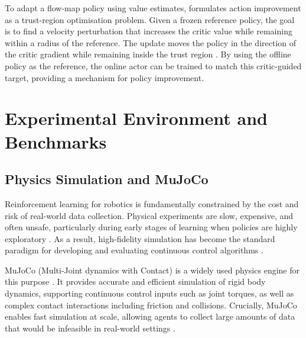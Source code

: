 To adapt a flow-map policy using value estimates, \cite{ziakas2026aligningflowmappolicies} formulates action improvement as a trust-region optimisation problem. Given a frozen reference policy, the goal is to find a velocity perturbation that increases the critic value while remaining within a radius of the reference.
The update moves the policy in the direction of the critic gradient while remaining inside the trust region \cite{ziakas2026aligningflowmappolicies}. By using the offline policy as the reference, the online actor can be trained to match this critic-guided target, providing a mechanism for policy improvement.

\section{Experimental Environment and Benchmarks}

\subsection{Physics Simulation and MuJoCo}

Reinforcement learning for robotics is fundamentally constrained by the cost and risk of real-world data collection. Physical experiments are slow, expensive, and often unsafe, particularly during early stages of learning when policies are highly exploratory \cite{kober2013reinforcement, dulacarnold2019challengesrealworldreinforcementlearning}. As a result, high-fidelity simulation has become the standard paradigm for developing and evaluating continuous control algorithms \cite{MUJOCO}.

MuJoCo (Multi-Joint dynamics with Contact) is a widely used physics engine for this purpose \cite{MUJOCO}. It provides accurate and efficient simulation of rigid body dynamics, supporting continuous control inputs such as joint torques, as well as complex contact interactions including friction and collisions. Crucially, MuJoCo enables fast simulation at scale, allowing agents to collect large amounts of data that would be infeasible in real-world settings \cite{MUJOCO}.

